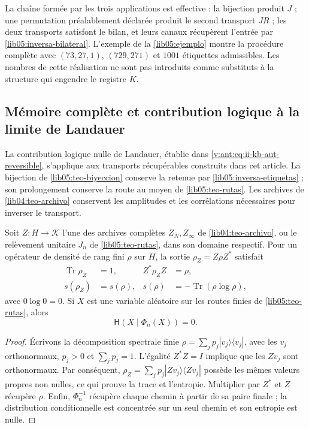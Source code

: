 La chaîne formée par les trois applications est effective : la bijection produit \(J\) ; une permutation préalablement déclarée produit le second transport \(JR\) ; les deux transports satisfont le bilan, et leurs canaux récupèrent l'entrée par \eqref{lib05:inversa-bilateral}. L'exemple de la \cref{lib05:ejemplo} montre la procédure complète avec \((73,27,1)\), \((729,271)\) et \(1001\) étiquettes admissibles. Les nombres de cette réalisation ne sont pas introduits comme substituts à la structure qui engendre le registre \(K\).

\subsection{Mémoire complète et contribution logique à la limite de Landauer}
\label{landauer:puente-archivo}

La contribution logique nulle de Landauer, établie dans
\eqref{v:ant:eq:ii-kb-aut-reversible}, s’applique aux transports
récupérables construits dans cet article. La bijection de
\cref{lib05:teo-biyeccion} conserve la retenue par
\eqref{lib05:inversa-etiquetas} ; son prolongement conserve la route
au moyen de \cref{lib05:teo-rutas}. Les archives de
\cref{lib04:teo-archivo} conservent les amplitudes et les corrélations
nécessaires pour inverser le transport.

\begin{corollary}
\label{landauer:cor-archivo}
Soit \(Z:H\to\mathcal K\) l’une des archives complètes
\(Z_N,Z_\infty\) de \cref{lib04:teo-archivo}, ou le relèvement
unitaire \(J_n\) de \cref{lib05:teo-rutas}, dans son domaine respectif.
Pour un opérateur de densité de rang fini \(\rho\) sur \(H\),
la sortie \(\rho_Z=Z\rho Z^*\) satisfait
\begin{align}
 \operatorname{Tr}\rho_Z&=1,& Z^*\rho_ZZ&=\rho,\\
 s(\rho_Z)&=s(\rho),&
 s(\rho)&=-\operatorname{Tr}(\rho\log\rho),
 \label{landauer:espectro}
\end{align}
avec \(0\log0=0\). Si \(X\) est une variable aléatoire sur les routes
finies de \cref{lib05:teo-rutas}, alors
\begin{equation}
 \mathsf H(X\mid\Phi_n(X))=0.
 \label{landauer:recuperacion-ruta}
\end{equation}
\end{corollary}
\begin{proof}
Écrivons la décomposition spectrale finie \(\rho=\sum_jp_j|v_j\rangle\langle v_j|\), avec les \(v_j\) orthonormaux, \(p_j>0\) et \(\sum_jp_j=1\). L'égalité \(Z^*Z=I\) implique que les \(Zv_j\) sont orthonormaux. Par conséquent, \(\rho_Z=\sum_jp_j|Zv_j\rangle\langle Zv_j|\) possède les mêmes valeurs propres non nulles, ce qui prouve la trace et l'entropie. Multiplier par \(Z^*\) et \(Z\) récupère \(\rho\). Enfin, \(\Phi_n^{-1}\) récupère chaque chemin à partir de sa paire finale ; la distribution conditionnelle est concentrée sur un seul chemin et son entropie est nulle.
\end{proof}

